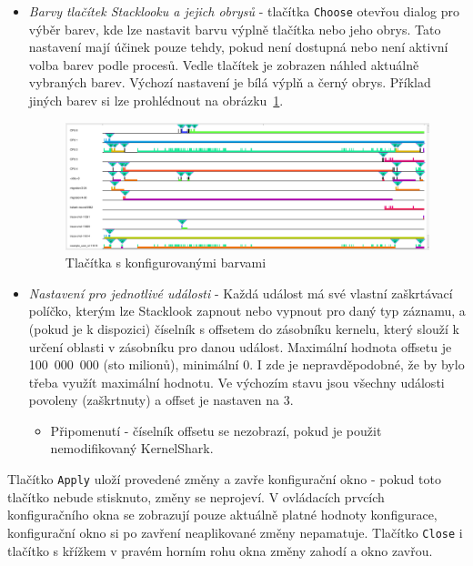 \begin{itemize}
  \item \emph{Barvy tlačítek Stacklooku a jejich obrysů} - tlačítka \texttt{Choose} otevřou dialog pro výběr barev, kde lze nastavit barvu výplně tlačítka nebo jeho obrys. Tato nastavení mají účinek pouze tehdy, pokud není dostupná nebo není aktivní volba barev podle procesů. Vedle tlačítek je zobrazen náhled aktuálně vybraných barev. Výchozí nastavení je bílá výplň a černý obrys. Příklad jiných barev si lze prohlédnout na obrázku~\ref{SlCustomDefaultColors}.
  
  \begin{figure}[p]\centering
      \includegraphics[width=140mm]{img/Stacklook/SlCustomDefaultColors}
      \caption{Tlačítka s konfigurovanými barvami}
      \label{SlCustomDefaultColors}
  \end{figure}

  \item \emph{Nastavení pro jednotlivé události} - Každá událost má své vlastní zaškrtávací políčko, kterým lze Stacklook zapnout nebo vypnout pro daný typ záznamu, a (pokud je k dispozici) číselník s offsetem do zásobníku kernelu, který slouží k určení  oblasti v zásobníku pro danou událost. Maximální hodnota offsetu je 100~000~000 (sto milionů), minimální 0. I zde je nepravděpodobné, že by bylo třeba využít maximální hodnotu. Ve výchozím stavu jsou všechny události povoleny (zaškrtnuty) a offset je nastaven na 3.

  \begin{itemize}
    \item Připomenutí - číselník offsetu se nezobrazí, pokud je použit nemodifikovaný KernelShark.
  \end{itemize}
\end{itemize}

Tlačítko \texttt{Apply} uloží provedené změny a zavře konfigurační okno - pokud toto tlačítko nebude stisknuto, změny se neprojeví. V ovládacích prvcích konfiguračního okna se zobrazují pouze aktuálně platné hodnoty konfigurace, konfigurační okno si po zavření neaplikované změny nepamatuje. Tlačítko \texttt{Close} i tlačítko s křížkem v pravém horním rohu okna změny zahodí a okno zavřou.

